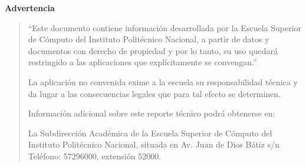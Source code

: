 \documentclass[10pt]{book}
\author{Escuela Superior de Cómputo (ESCOM)}
\begin{document}
    \frontmatter
        \maketitle
        \makeDocInfo
        \makeObservaciones
        \makeFirmas
        
        \thispagestyle{empty}
        \begin{center}
            \textbf{\large Advertencia}
        \end{center}
        
        \vspace{0.5cm}
        
        \begin{quote}
        \noindent
        ``Este documento contiene información desarrollada por la Escuela Superior de Cómputo del Instituto Politécnico Nacional, a partir de datos y documentos con derecho de propiedad y por lo tanto, su uso quedará restringido a las aplicaciones que explícitamente se convengan.''
        
        \vspace{0.3cm}
        
        \noindent
        La aplicación no convenida exime a la escuela su responsabilidad técnica y da lugar a las consecuencias legales que para tal efecto se determinen.
        
        \vspace{0.5cm}
        
        \noindent
        Información adicional sobre este reporte técnico podrá obtenerse en:
        
        \vspace{0.3cm}
        
        \noindent
        La Subdirección Académica de la Escuela Superior de Cómputo del Instituto Politécnico Nacional, situada en Av. Juan de Dios Bátiz s/n Teléfono: 57296000, extensión 52000.
        \end{quote}
        
        \clearpage
        
        \tableofcontents
        \listoffigures
        \listoftables
    \mainmatter
    

\end{document}
